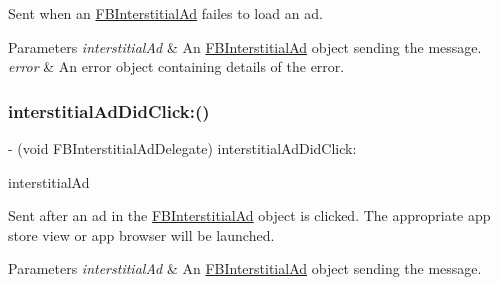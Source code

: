 Sent when an \hyperlink{interfaceFBInterstitialAd}{F\+B\+Interstitial\+Ad} failes to load an ad.


\begin{DoxyParams}{Parameters}
{\em interstitial\+Ad} & An \hyperlink{interfaceFBInterstitialAd}{F\+B\+Interstitial\+Ad} object sending the message. \\
\hline
{\em error} & An error object containing details of the error. \\
\hline
\end{DoxyParams}
\mbox{\label{protocolFBInterstitialAdDelegate_01-p_a03799a3b2c114c7169b0cb1cf7c81132}} 
\subsubsection{\texorpdfstring{interstitial\+Ad\+Did\+Click\+:()}{interstitialAdDidClick:()}\hspace{0.1cm}{\footnotesize\ttfamily [1/5]}}
{\footnotesize\ttfamily -\/ (void F\+B\+Interstitial\+Ad\+Delegate) interstitial\+Ad\+Did\+Click\+: \begin{DoxyParamCaption}\item[{(\hyperlink{interfaceFBInterstitialAd}{F\+B\+Interstitial\+Ad} $\ast$)}]{interstitial\+Ad }\end{DoxyParamCaption}\hspace{0.3cm}{\ttfamily [optional]}}

Sent after an ad in the \hyperlink{interfaceFBInterstitialAd}{F\+B\+Interstitial\+Ad} object is clicked. The appropriate app store view or app browser will be launched.


\begin{DoxyParams}{Parameters}
{\em interstitial\+Ad} & An \hyperlink{interfaceFBInterstitialAd}{F\+B\+Interstitial\+Ad} object sending the message. \\
\hline
\end{DoxyParams}
\mbox{\label{protocolFBInterstitialAdDelegate_01-p_a03799a3b2c114c7169b0cb1cf7c81132}} 
